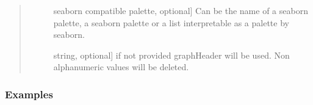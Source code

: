 \documentclass[letterpaper,10pt,english]{sphinxmanual}
\begin{document}
\begin{fulllineitems}
\begin{quote}
\begin{description}
\begin{description}
\item[{}] \leavevmode{[}seaborn compatible palette, optional{]}
Can be the name of a seaborn palette, 
a seaborn palette or a list interpretable 
as a palette by seaborn.

\item[{}] \leavevmode{[}string, optional{]}
if not provided graphHeader will be used. 
Non alphanumeric values will be deleted.

\end{description}

\end{description}\end{quote}
\subsubsection*{Examples}


\end{fulllineitems}
\end{document}
